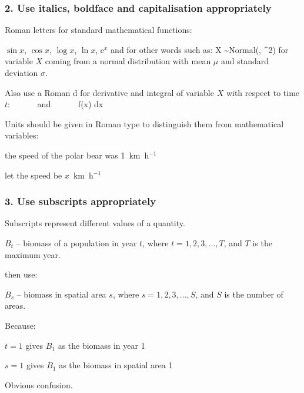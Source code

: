 \begin{frame}
\frametitle{2. Use italics, boldface and capitalisation appropriately}

Roman letters for standard mathematical functions:
\bi
\item $\sin x$, $\cos x$, $\log x$, $\ln x$, e$^x$
\ei
and for other words such as:
\eb
\nonumber X \sim \mbox{Normal}(\mu, \sigma^2)
\label{Xnormal}
\ee
\pause
for variable $X$ coming from a normal distribution with mean $\mu$ and
standard deviation $\sigma$.
\pause

\medskip
Also use a Roman d for derivative and integral of variable $X$ with respect to time $t$:
\eb
\nonumber {} ~~~~~~\mbox{and}~~~~~~ \int f(x) \mbox{d}x
\ee

\pause
\medskip

Units should be given in Roman type to distinguish them from mathematical variables:
\bi
\item the speed of the polar bear was 1~km~h$^{-1}$
\item let the speed be $x$~km~h$^{-1}$
\ei

\end{frame}


\begin{frame}
\frametitle{3. Use subscripts appropriately}

Subscripts represent different values of a quantity.

\bi
\item $B_t$ -- biomass of a population in year $t$, where
$t=1, 2, 3, ..., T$, and $T$ is the maximum year.
\ei

\pause

 then use:

\bi
\item $B_s$ -- biomass in spatial area $s$, where $s=1, 2, 3, ..., S$, and $S$
  is the number of areas.
  \ei

\pause

Because:

\bi
\item $t=1$ gives $B_1$ as the biomass in year 1

\item $s=1$ gives $B_1$ as the biomass in spatial area 1
\ei

Obvious confusion.

\end{frame}

